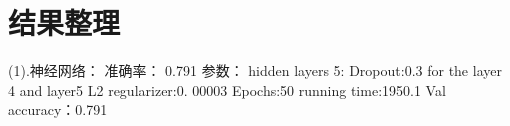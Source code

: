 \chapter{结果整理}

(1).神经网络：
准确率：
0.791
参数：
hidden layers 5:
Dropout:0.3 for the layer 4 and layer5 
L2 regularizer:0. 00003
Epochs:50
running time:1950.1
Val accuracy：0.791
